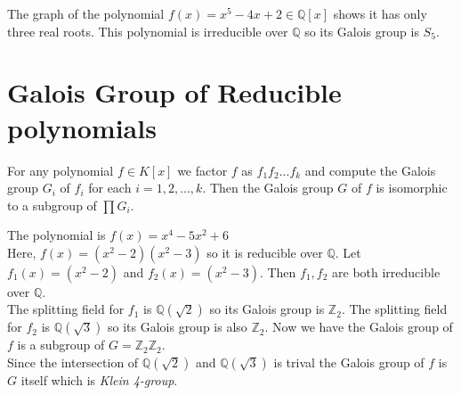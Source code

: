 \begin{example}
The graph of the polynomial \(f(x)=x^5-4x+2 \in \mathbb{Q}[x]\) shows it has only three real roots. This polynomial is irreducible over \(\mathbb{Q}\) so its Galois group is \(S_5\).
\end{example}

\section{Galois Group of Reducible polynomials}
For any polynomial \(f \in K[x]\) we factor \(f\) as \(f_1f_2...f_k\) and compute the Galois group \(G_i\)  of \(f_i\) for each \(i=1,2,...,k\). Then the Galois group \(G\) of \(f\) is isomorphic to a subgroup of \(\prod G_i\).\\

\begin{example}
  The polynomial is \(f(x) = x^4-5x^2+6\)\\
  Here, \(f(x)=(x^2-2)(x^2-3)\) so it is reducible over \(\mathbb{Q}\). Let \(f_1(x)=(x^2-2)\) and \(f_2(x)=(x^2-3)\). Then \(f_1,f_2\) are both irreducible over \(\mathbb{Q}\).\\
  The splitting field for \(f_1\) is \(\mathbb{Q}(\sqrt{2})\) so its Galois group is \({\mathbb{Z}}_2\). The splitting field for \(f_2\) is \(\mathbb{Q}(\sqrt{3})\) so its Galois group is also \({\mathbb{Z}}_2\). Now we have the Galois group of \(f\) is a subgroup of \(G={\mathbb{Z}}_2 {\mathbb{Z}}_2\). \\
  Since the intersection of \(\mathbb{Q}(\sqrt{2})\) and \(\mathbb{Q}(\sqrt{3})\) is trival the Galois group of \(f\) is \(G\) itself which is \textit{Klein 4-group}. %


\end{example}





